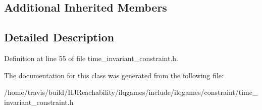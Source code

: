 \subsection*{Additional Inherited Members}


\subsection{Detailed Description}


Definition at line 55 of file time\+\_\+invariant\+\_\+constraint.\+h.



The documentation for this class was generated from the following file\+:\begin{DoxyCompactItemize}
\item 
/home/travis/build/\+H\+J\+Reachability/ilqgames/include/ilqgames/constraint/time\+\_\+invariant\+\_\+constraint.\+h\end{DoxyCompactItemize}

